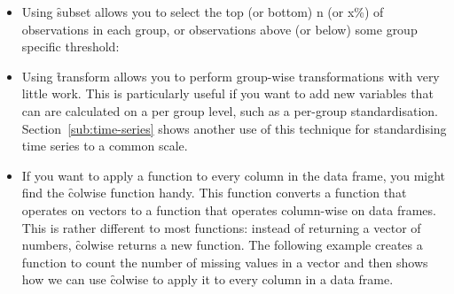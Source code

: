 \begin{itemize}
  \item Using \f{subset} allows you to select the top (or bottom) n (or x\%) of observations in each group, or observations above (or below) some group specific threshold:
  
    
  
  \item Using \f{transform} allows you to perform group-wise transformations with very little work.  This is particularly useful if you want to add new variables that can are calculated on a per group level, such as a per-group standardisation.  Section~\ref{sub:time-series} shows another use of this technique for standardising time series to a common scale.
  
    

  \item If you want to apply a function to every column in the data frame, you might find the \f{colwise} function handy. This function converts a function that operates on vectors to a function that operates column-wise on data frames. This is rather different to most functions: instead of returning a vector of numbers, \f{colwise} returns a new function. The following example creates a function to count the number of missing values in a vector and then shows how we can use \f{colwise} to apply it to every column in a data frame.

    
  

\end{itemize}
